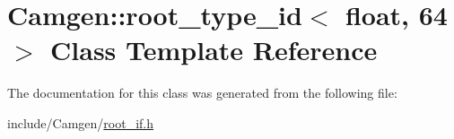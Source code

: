 \hypertarget{a00486}{}\section{Camgen\+:\+:root\+\_\+type\+\_\+id$<$ float, 64 $>$ Class Template Reference}
\label{a00486}


The documentation for this class was generated from the following file\+:\begin{DoxyCompactItemize}
\item 
include/\+Camgen/\hyperlink{a00760}{root\+\_\+if.\+h}\end{DoxyCompactItemize}

